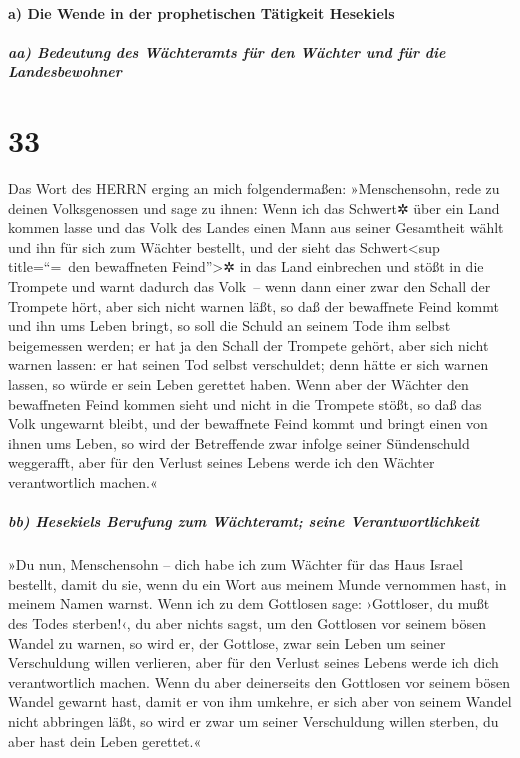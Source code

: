 \hypertarget{a-die-wende-in-der-prophetischen-tuxe4tigkeit-hesekiels}{%
\paragraph{a) Die Wende in der prophetischen Tätigkeit
Hesekiels}\label{a-die-wende-in-der-prophetischen-tuxe4tigkeit-hesekiels}}

\hypertarget{aa-bedeutung-des-wuxe4chteramts-fuxfcr-den-wuxe4chter-und-fuxfcr-die-landesbewohner}{%
\subparagraph{aa) Bedeutung des Wächteramts für den Wächter und für die
Landesbewohner}\label{aa-bedeutung-des-wuxe4chteramts-fuxfcr-den-wuxe4chter-und-fuxfcr-die-landesbewohner}}

\hypertarget{section-32}{%
\section{33}\label{section-32}}

Das Wort des HERRN erging an mich folgendermaßen:
»Menschensohn, rede zu deinen Volksgenossen und sage zu
ihnen: Wenn ich das Schwert✲ über ein Land kommen lasse und das Volk des
Landes einen Mann aus seiner Gesamtheit wählt und ihn für sich zum
Wächter bestellt, und der sieht das Schwert\textless sup
title=``=~den bewaffneten Feind''\textgreater✲ in das Land einbrechen
und stößt in die Trompete und warnt dadurch das Volk~--
wenn dann einer zwar den Schall der Trompete hört, aber
sich nicht warnen läßt, so daß der bewaffnete Feind kommt und ihn ums
Leben bringt, so soll die Schuld an seinem Tode ihm selbst beigemessen
werden; er hat ja den Schall der Trompete gehört, aber
sich nicht warnen lassen: er hat seinen Tod selbst verschuldet; denn
hätte er sich warnen lassen, so würde er sein Leben gerettet haben.
Wenn aber der Wächter den bewaffneten Feind kommen sieht
und nicht in die Trompete stößt, so daß das Volk ungewarnt bleibt, und
der bewaffnete Feind kommt und bringt einen von ihnen ums Leben, so wird
der Betreffende zwar infolge seiner Sündenschuld weggerafft, aber für
den Verlust seines Lebens werde ich den Wächter verantwortlich machen.«

\hypertarget{bb-hesekiels-berufung-zum-wuxe4chteramt-seine-verantwortlichkeit}{%
\subparagraph{bb) Hesekiels Berufung zum Wächteramt; seine
Verantwortlichkeit}\label{bb-hesekiels-berufung-zum-wuxe4chteramt-seine-verantwortlichkeit}}

»Du nun, Menschensohn -- dich habe ich zum Wächter für das
Haus Israel bestellt, damit du sie, wenn du ein Wort aus meinem Munde
vernommen hast, in meinem Namen warnst. Wenn ich zu dem
Gottlosen sage: ›Gottloser, du mußt des Todes sterben!‹, du aber nichts
sagst, um den Gottlosen vor seinem bösen Wandel zu warnen, so wird er,
der Gottlose, zwar sein Leben um seiner Verschuldung willen verlieren,
aber für den Verlust seines Lebens werde ich dich verantwortlich machen.
Wenn du aber deinerseits den Gottlosen vor seinem bösen
Wandel gewarnt hast, damit er von ihm umkehre, er sich aber von seinem
Wandel nicht abbringen läßt, so wird er zwar um seiner Verschuldung
willen sterben, du aber hast dein Leben gerettet.«

